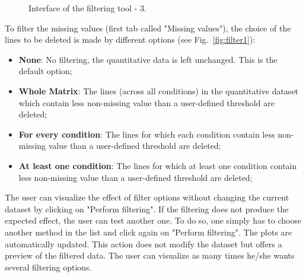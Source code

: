 \documentclass[12pt]{article}
\begin{document}
{\begin {figure}
\centering
{}
\caption{Interface of the filtering tool - 3.}\label{fig:filter3}
\end {figure}

To filter the missing values (first tab called "Missing values"), the choice 
of the lines to be deleted is made by different options (see 
Fig.~\ref{fig:filter1}):
\begin {itemize}
\item\textbf{None}: No filtering, the quantitative data is left unchanged. 
This is the default option;
\item\textbf{Whole Matrix}: The lines (across all conditions) in the 
quantitative dataset which contain less non-missing value than a 
user-defined threshold are deleted;
\item\textbf{For every condition}: The lines for which each condition 
contain less non-missing value than a user-defined threshold are deleted;
\item\textbf{At least one condition}: The lines for which at least one 
condition contain less non-missing value than a user-defined threshold 
are deleted;
\end {itemize}

The user can visualize the effect of filter options without changing the 
current dataset by clicking on "Perform filtering". If the filtering does not 
produce the expected effect, the user can test another one. To do so, one 
simply has to choose another method in the list and click again on "Perform 
filtering". The plots are automatically updated. This action does not modify 
the dataset but offers a preview of the filtered data. The user can visualize 
as many times he/she wants several filtering options. 

}
\end{document}
